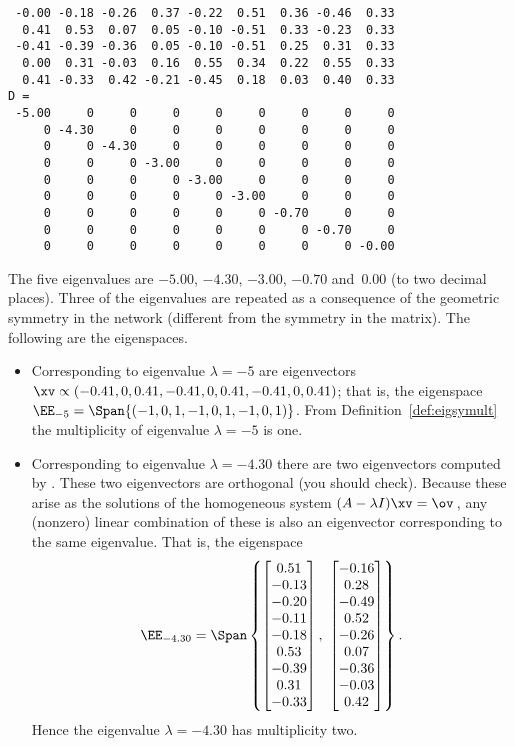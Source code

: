 \begin{example}
\begin{solution}
{\begin{verbatim}
 -0.00 -0.18 -0.26  0.37 -0.22  0.51  0.36 -0.46  0.33
  0.41  0.53  0.07  0.05 -0.10 -0.51  0.33 -0.23  0.33
 -0.41 -0.39 -0.36  0.05 -0.10 -0.51  0.25  0.31  0.33
  0.00  0.31 -0.03  0.16  0.55  0.34  0.22  0.55  0.33
  0.41 -0.33  0.42 -0.21 -0.45  0.18  0.03  0.40  0.33
D =
 -5.00     0     0     0     0     0     0     0     0
     0 -4.30     0     0     0     0     0     0     0
     0     0 -4.30     0     0     0     0     0     0
     0     0     0 -3.00     0     0     0     0     0
     0     0     0     0 -3.00     0     0     0     0
     0     0     0     0     0 -3.00     0     0     0
     0     0     0     0     0     0 -0.70     0     0
     0     0     0     0     0     0     0 -0.70     0
     0     0     0     0     0     0     0     0 -0.00
\end{verbatim}
}%
The five eigenvalues are \(-5.00\), \(-4.30\), \(-3.00\), \(-0.70\) and~\(0.00\) (to two decimal places).
Three of the eigenvalues are repeated as a consequence of the geometric symmetry in the network (different from the symmetry in the matrix).
The following are the eigenspaces.
\begin{itemize}
\item Corresponding to eigenvalue \(\lambda=-5\) are eigenvectors \(\xv\propto(-0.41,0,0.41,-0.41,0,0.41,-0.41,0,0.41)\); that is, the eigenspace \(\EE_{-5}=\Span\{(-1,0,1,-1,0,1,-1,0,1)\}\).
From Definition~\ref{def:eigsymult} the multiplicity of eigenvalue \(\lambda=-5\) is one.

\item Corresponding to eigenvalue \(\lambda=-4.30\) there are two eigenvectors computed by \script.
These two eigenvectors are orthogonal (you should check).
Because these arise as the solutions of the homogeneous system \((A-\lambda I)\xv=\ov\)\,, any (nonzero) linear combination of these is also an eigenvector corresponding to the same eigenvalue. 
That is, the eigenspace
\begin{equation*}
\EE_{-4.30}=\Span\left\{ \begin{bmatrix} 0.51\\-0.13\\-0.20\\-0.11\\-0.18\\0.53\\-0.39\\0.31\\-0.33 \end{bmatrix},\  \begin{bmatrix} -0.16\\0.28\\-0.49\\0.52\\-0.26\\0.07\\-0.36\\-0.03\\0.42 \end{bmatrix} \right\}.
\end{equation*}
Hence the eigenvalue \(\lambda=-4.30\) has multiplicity two.


\end{itemize}
\end{solution}
\end{example}
